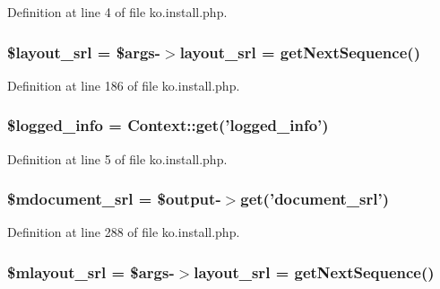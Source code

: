 Definition at line 4 of file ko.\-install.\-php.

\hypertarget{ko_8install_8php_a77889723c4aa360089caae223118d413}{
\subsubsection[{\$layout\-\_\-srl}]{\setlength{\rightskip}{0pt plus 5cm}\${\bf layout\-\_\-srl} = \$args-\/$>${\bf layout\-\_\-srl} = {\bf get\-Next\-Sequence}()}}\label{ko_8install_8php_a77889723c4aa360089caae223118d413}


Definition at line 186 of file ko.\-install.\-php.

\hypertarget{ko_8install_8php_a193c1593ceb216e9fb05b0bad01ebbc8}{
\subsubsection[{\$logged\-\_\-info}]{\setlength{\rightskip}{0pt plus 5cm}\$logged\-\_\-info = {\bf Context\-::get}('logged\-\_\-info')}}\label{ko_8install_8php_a193c1593ceb216e9fb05b0bad01ebbc8}


Definition at line 5 of file ko.\-install.\-php.

\hypertarget{ko_8install_8php_a27c211d9a984964f84c8ffb6ea7328fc}{
\subsubsection[{\$mdocument\-\_\-srl}]{\setlength{\rightskip}{0pt plus 5cm}\$mdocument\-\_\-srl = \$output-\/$>$get('document\-\_\-srl')}}\label{ko_8install_8php_a27c211d9a984964f84c8ffb6ea7328fc}


Definition at line 288 of file ko.\-install.\-php.

\hypertarget{ko_8install_8php_a576210f0eec2e42df2c40e04a3972bb0}{
\subsubsection[{\$mlayout\-\_\-srl}]{\setlength{\rightskip}{0pt plus 5cm}\${\bf mlayout\-\_\-srl} = \$args-\/$>${\bf layout\-\_\-srl} = {\bf get\-Next\-Sequence}()}}\label{ko_8install_8php_a576210f0eec2e42df2c40e04a3972bb0}


